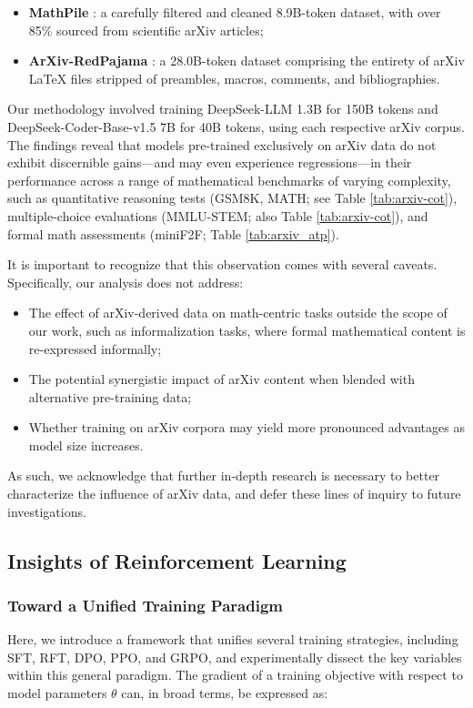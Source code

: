 {\begin{itemize}[topsep=0pt]
    \item \textbf{MathPile} \citep{mathpile}: a carefully filtered and cleaned 8.9B-token dataset, with over 85\% sourced from scientific arXiv articles;
    \item \textbf{ArXiv-RedPajama} \citep{redpajama}: a 28.0B-token dataset comprising the entirety of arXiv LaTeX files stripped of preambles, macros, comments, and bibliographies.
\end{itemize}

Our methodology involved training DeepSeek-LLM 1.3B for 150B tokens and DeepSeek-Coder-Base-v1.5 7B for 40B tokens, using each respective arXiv corpus. The findings reveal that models pre-trained exclusively on arXiv data do not exhibit discernible gains—and may even experience regressions—in their performance across a range of mathematical benchmarks of varying complexity, such as quantitative reasoning tests (GSM8K, MATH; see Table \ref{tab:arxiv-cot}), multiple-choice evaluations (MMLU-STEM; also Table \ref{tab:arxiv-cot}), and formal math assessments (miniF2F; Table \ref{tab:arxiv_atp}).

It is important to recognize that this observation comes with several caveats. Specifically, our analysis does not address:

\begin{itemize}[topsep=0pt]
    \item The effect of arXiv-derived data on math-centric tasks outside the scope of our work, such as informalization tasks, where formal mathematical content is re-expressed informally;
    \item The potential synergistic impact of arXiv content when blended with alternative pre-training data;
    \item Whether training on arXiv corpora may yield more pronounced advantages as model size increases.
\end{itemize}

As such, we acknowledge that further in-depth research is necessary to better characterize the influence of arXiv data, and defer these lines of inquiry to future investigations.

\subsection{Insights of Reinforcement Learning}
\subsubsection{Toward a Unified Training Paradigm} Here, we introduce a framework that unifies several training strategies, including SFT, RFT, DPO, PPO, and GRPO, and experimentally dissect the key variables within this general paradigm. The gradient of a training objective with respect to model parameters $\theta$ can, in broad terms, be expressed as:

}
